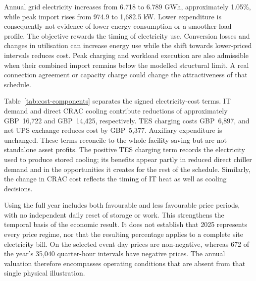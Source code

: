 Annual grid electricity increases from 6.718 to 6.789 GWh, approximately 1.05\%, while peak import rises from 974.9 to 1,682.5 kW. Lower expenditure is consequently not evidence of lower energy consumption or a smoother load profile. The objective rewards the timing of electricity use. Conversion losses and changes in utilisation can increase energy use while the shift towards lower-priced intervals reduces cost. Peak charging and workload execution are also admissible when their combined import remains below the modelled structural limit. A real connection agreement or capacity charge could change the attractiveness of that schedule.



Table~\ref{tab:cost-components} separates the signed electricity-cost terms. IT demand and direct CRAC cooling contribute reductions of approximately GBP~16,722 and GBP~14,425, respectively. TES charging costs GBP~6,897, and net UPS exchange reduces cost by GBP~5,377. Auxiliary expenditure is unchanged. These terms reconcile to the whole-facility saving but are not standalone asset profits. The positive TES charging term records the electricity used to produce stored cooling; its benefits appear partly in reduced direct chiller demand and in the opportunities it creates for the rest of the schedule. Similarly, the change in CRAC cost reflects the timing of IT heat as well as cooling decisions.

Using the full year includes both favourable and less favourable price periods, with no independent daily reset of storage or work. This strengthens the temporal basis of the economic result. It does not establish that 2025 represents every price regime, nor that the resulting percentage applies to a complete site electricity bill. On the selected event day prices are non-negative, whereas 672 of the year's 35,040 quarter-hour intervals have negative prices. The annual valuation therefore encompasses operating conditions that are absent from that single physical illustration.

